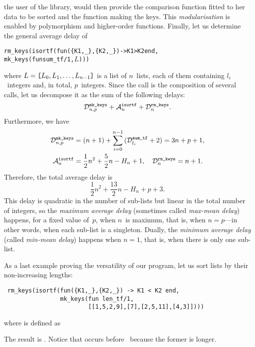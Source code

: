the user of the library, would then provide the comparison function
fitted to her data to be sorted and the function making the keys. This
\emph{modularisation} is enabled by polymorphism and higher\hyp{}order
functions. Finally, let us determine the general average delay of
\begin{alltt}
      rm\_keys(isortf(fun(\{K1,\_\},\{K2,\_\}) -> K1 > K2 end,
                     mk\_keys(fun sum\_tf/1,\(L\))))
\end{alltt}
where \(L=\erlcode{[}L_0,L_1,\dots,L_{n-1}\erlcode{]}\) is a list of
\(n\)~lists, each of them containing \(l_i\)~integers and, in total,
\(p\)~integers. Since the call is the composition of several calls,
let us decompose it as the sum of the following delays:
\[
\comp{mk\_keys}{n,p} + \ave{isortf}{n} + \comp{rm\_keys}{n}.
\]
Furthermore, we have
\begin{align*}
\comp{mk\_keys}{n,p}
  &= (n+1) + \sum_{i=0}^{n-1}{(\comp{sum\_tf}{l_i} + 2)} = 3n + p + 1,\\
\ave{isortf}{n}
  &= \frac{1}{2}{n^2} + \frac{5}{2}{n} - H_n + 1,\quad
\comp{rm\_keys}{n}
  = n + 1.
\end{align*}
Therefore, the total average delay is
\[
\frac{1}{2}{n^2} + \frac{13}{2}{n} - H_n + p + 3.
\]
This delay is quadratic in the number of sub\hyp{}lists but linear in
the total number of integers, so the \emph{maximum average delay}
(sometimes called \emph{max\hyp{}mean delay}) happens, for a fixed
value of~\(p\), when \(n\)~is maximum, that is, when \(n=p\)---in
other words, when each sub\hyp{}list is a singleton. Dually, the
\emph{minimum average delay} (called \emph{min\hyp{}mean delay})
happens when \(n=1\), that is, when there is only one sub\hyp{}list.

As a last example proving the versatility of our program, let us sort
lists by their non\hyp{}increasing lengths:
\begin{verbatim}
 rm_keys(isortf(fun({K1,_},{K2,_}) -> K1 < K2 end,
                mk_keys(fun len_tf/1,
                        [[1,5,2,9],[7],[2,5,11],[4,3]])))
\end{verbatim}
where  is defined as\label{code:len_tf}

The result is \erlcode{[[1,5,2,9],[2,5,11],[4,3],[7]]}. Notice that
\erlcode{[4,3]} occurs before~\erlcode{[7]} because the former is
longer.

